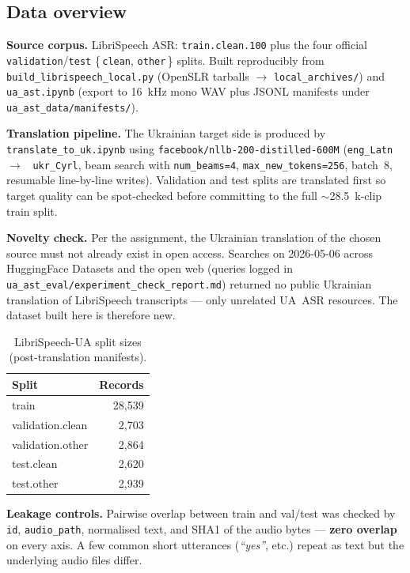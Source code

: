 \documentclass[11pt]{article}
\begin{document}
\subsection{Data overview}
\textbf{Source corpus.} LibriSpeech ASR: \texttt{train.clean.100} plus the
four official \texttt{validation}/\texttt{test} \{\,\texttt{clean},
\texttt{other}\,\} splits. Built reproducibly from
\texttt{build\_librispeech\_local.py} (OpenSLR tarballs $\rightarrow$
\texttt{local\_archives/}) and \texttt{ua\_ast.ipynb} (export to
16~kHz mono WAV plus JSONL manifests under
\texttt{ua\_ast\_data/manifests/}).

\noindent\textbf{Translation pipeline.} The Ukrainian target side is produced
by \texttt{translate\_to\_uk.ipynb} using
\texttt{facebook/nllb-200-distilled-600M} (\texttt{eng\_Latn}~$\rightarrow$~%
\texttt{ukr\_Cyrl}, beam search with \texttt{num\_beams=4},
\texttt{max\_new\_tokens=256}, batch~8, resumable line-by-line writes).
Validation and test splits are translated first so target quality can be
spot-checked before committing to the full $\sim$28.5~k-clip train split.

\noindent\textbf{Novelty check.} Per the assignment, the Ukrainian
translation of the chosen source must not already exist in open access.
Searches on 2026-05-06 across HuggingFace Datasets and the open web
(queries logged in \texttt{ua\_ast\_eval/experiment\_check\_report.md})
returned no public Ukrainian translation of LibriSpeech transcripts ---
only unrelated UA~ASR resources. The dataset built here is therefore new.

\begin{table}[h]
\centering
\begin{tabular}{lr}
\toprule
\textbf{Split} & \textbf{Records} \\
\midrule
train               & 28{,}539 \\
validation.clean    & 2{,}703 \\
validation.other    & 2{,}864 \\
test.clean          & 2{,}620 \\
test.other          & 2{,}939 \\
\bottomrule
\end{tabular}
\caption{LibriSpeech-UA split sizes (post-translation manifests).}
\end{table}

\noindent\textbf{Leakage controls.} Pairwise overlap between train and
val/test was checked by \texttt{id}, \texttt{audio\_path}, normalised text,
and SHA1 of the audio bytes --- \textbf{zero overlap} on every axis.
A few common short utterances (\textit{``yes''}, etc.) repeat as text but
the underlying audio files differ.
\end{document}
